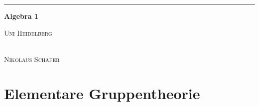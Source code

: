 \documentclass[10pt,a4paper,numbers=endperiod]{scrreprt}
\theoremstyle{definition}
\def\Namen{} %
\def\Datum{} %
\begin{document}
\Namen \hfill \Datum\par
\vspace{0.25\baselineskip}
\hrule
\vspace{\baselineskip}
\begin{center}
{\LARGE\textbf{Algebra 1}}\par
\vspace{0.25\baselineskip}
{\large\textsc{Uni Heidelberg}}
\end{center}

\vspace{\baselineskip}
\vspace{\baselineskip}
\vspace{\baselineskip}
\vspace{\baselineskip}
\vspace{\baselineskip}
\vspace{\baselineskip}
\vspace{\baselineskip}
\vspace{\baselineskip}
\vspace{\baselineskip}
\vspace{\baselineskip}
\vspace{\baselineskip}  
\vspace{\baselineskip}
\vspace{\baselineskip}
\vspace{\baselineskip}
\vspace{\baselineskip}
\vspace{\baselineskip}
\vspace{\baselineskip}
\vspace{\baselineskip}
\vspace{\baselineskip}
\vspace{\baselineskip}
\vspace{\baselineskip}

\begin{center}
	{\large{}}\\
	\vspace{0.3\baselineskip}
	{\large\textsc{Nikolaus Schäfer}}
\end{center}

\newpage
\vspace{0.125\baselineskip}
\tableofcontents %
\newpage
\part{Elementare Gruppentheorie}
\end{document}
